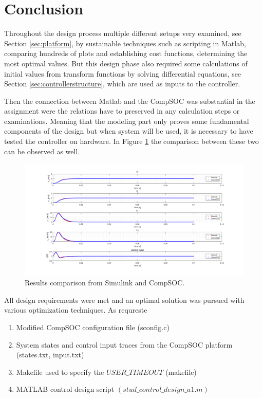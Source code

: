 
\section{Conclusion}
Throughout the design process multiple different setups very examined, see Section \ref{sec:platform}, by sustainable techniques such as scripting in Matlab, comparing hundreds of plots and establishing cost functions, determining the most optimal values. But this design phase also required some calculations of initial values from transform functions by solving differential equations, see Section \ref{sec:controllerstructure}, which are used as inputs to the controller. 

Then the connection between Matlab and the CompSOC was substantial in the assignment were the relations have to preserved in any calculation steps or examinations. Meaning that the modeling part only proves some fundamental components of the design but when system will be used, it is necessary to have tested the controller on hardware. In Figure \ref{fig:finalresult} the comparison between these two can be observed as well.

\begin{figure}[h]
	\begin{center}
		\includegraphics[width=\linewidth]{img/finalresult}
		\caption{Results comparison from Simulink and CompSOC.}
		\label{fig:finalresult}
	\end{center}
\end{figure}

All design requirements were met and an optimal solution was pursued with various optimization techniques. As requreste

\begin{enumerate}
	\item Modified CompSOC configuration file (sconfig.c)
	\item System states	and	control	input traces from the CompSOC platform (states.txt,	input.txt)
	\item Makefile used	to	specify	the	$USER\_TIMEOUT$	(makefile)
	\item MATLAB	control	design	script	$(stud\_control\_design\_a1.m)$
\end{enumerate}